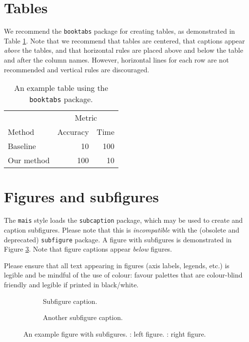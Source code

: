 \documentclass[11pt]{article}
\begin{document}
\section{Tables}

We recommend the \texttt{booktabs} package for creating tables, as demonstrated in Table \ref{example_table}. Note that we recommend that tables are centered, that captions appear \emph{above} the tables, and that horizontal rules are placed above and below the table and after the column names. However, horizontal lines for each row are not recommended and vertical rules are discouraged.

\begin{table}
  \caption{An example table using the \texttt{booktabs} package.}
  \label{example_table}
  \centering
  \begin{tabular}{lrr}
    \toprule
    & \multicolumn{2}{c}{Metric} \\
    \cmidrule{2-3}
    Method & Accuracy & Time \\
    \midrule
    Baseline & 10 & 100 \\
    Our method & 100 & 10 \\
    \bottomrule
  \end{tabular}
\end{table}

\section{Figures and subfigures}

The \texttt{mais} style loads the \texttt{subcaption} package, which may be used to create and caption subfigures. Please note that this is \emph{incompatible} with the (obsolete and deprecated) \texttt{subfigure} package. A figure with subfigures is demonstrated in Figure \ref{example_figure}. Note that figure captions appear \emph{below} figures.

Please ensure that all text appearing in figures (axis labels, legends, etc.) is legible and be mindful of the use of colour: favour palettes that are colour-blind friendly and legible if printed in black/white.

\begin{figure}
  \begin{subfigure}[t]{0.5\linewidth}
    \centering
    \caption{Subfigure caption.}
    \label{example_figure_left}
  \end{subfigure}
  \begin{subfigure}[t]{0.5\linewidth}
    \centering
    \caption{Another subfigure caption.}
    \label{example_figure_right}
  \end{subfigure}
  \caption{An example figure with subfigures. : left figure. : right figure.}
  \label{example_figure}
\end{figure}
\end{document}
